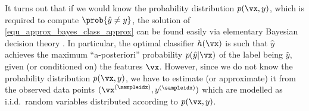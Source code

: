\documentclass[12pt]{report}
\begin{document}
It turns out that if we would know the probability distribution $p(\vx,y)$, which 
is required to compute $\prob{ \hat{y} \neq y}$, the solution of \eqref{equ_approx_bayes_class_approx} 
can be found easily via elementary Bayesian decision theory \cite{PoorDetEst}. In particular, 
the optimal classifier $h(\vx)$ is such that $\hat{y}$ achieves the maximum ``a-posteriori'' 
probability $p(\hat{y}|\vx)$ of the label being $\hat{y}$, given (or conditioned on) the features 
$\vx$. However, since we do not know the probability distribution $p(\vx,y)$, we have to estimate 
(or approximate) it from the observed data points $(\vx^{(\sampleidx)},y^{(\sampleidx)})$ which 
are modelled as i.i.d.\ random variables distributed according to $p(\vx,y)$. 
\end{document}
